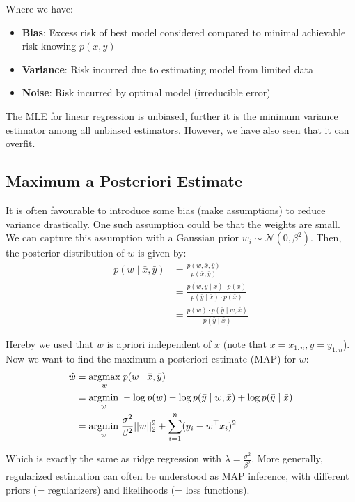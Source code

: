 Where we have:
\begin{itemize}
	\item \textbf{Bias}: Excess risk of best model considered compared to minimal achievable risk knowing $p(x,y)$
	\item \textbf{Variance}: Risk incurred due to estimating model from limited data
	\item \textbf{Noise}: Risk incurred by optimal model (irreducible error)
\end{itemize}

The MLE for linear regression is unbiased, further it is the minimum variance estimator among all unbiased estimators. However, we have also seen that it can overfit.

\subsection{Maximum a Posteriori Estimate}

It is often favourable to introduce some bias (make assumptions) to reduce variance drastically. One such assumption could be that the weights are small. We can capture this assumption with a Gaussian prior $w_i \sim \mathcal{N}(0, \beta^2)$. Then, the posterior distribution of $w$ is given by:
\begin{align*}
	p(w \; | \; \bar x, \bar y) &= \frac{p(w, \bar x, \bar y)}{p(\bar x, \bar y)} \\
	&= \frac{p(w, \bar y \; | \; \bar x) \cdot p(\bar x)}{p(\bar y \; | \; \bar x) \cdot p(\bar x)} \\
	&= \frac{p(w) \cdot p(\bar y \; | \; w, \bar x)}{p(\bar y \; | \; \bar x)}
\end{align*}

Hereby we used that $w$ is apriori independent of $\bar x$ (note that $\bar x = x_{1:n}, \bar y = y_{1:n}$). Now we want to find the maximum a posteriori estimate (MAP) for $w$:
\begin{align*}
	\hat w &= \underset{w}{\text{argmax}} \; p(w \; | \; \bar x, \bar y) \\
	&= \underset{w}{\text{argmin}} \; - \log p(w) - \log p(\bar y \; | \; w, \bar x) + \log p(\bar y \; | \; \bar x) \\
	&= \underset{w}{\text{argmin}} \; \frac{\sigma^2}{\beta^2} ||w||_2^2 + \sum_{i=1}^n(y_i - w^\top x_i)^2
\end{align*}

Which is exactly the same as ridge regression with $\lambda = \frac{\sigma^2}{\beta^2}$. More generally, regularized estimation can often be understood as MAP inference, with different priors (= regularizers) and likelihoods (= loss functions).

